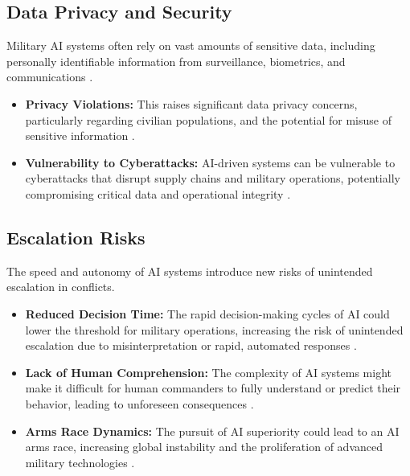 \subsection{Data Privacy and Security}
Military AI systems often rely on vast amounts of sensitive data, including personally identifiable information from surveillance, biometrics, and communications \cite{IE_DataPrivacy}.
\begin{itemize}
    \item \textbf{Privacy Violations:} This raises significant data privacy concerns, particularly regarding civilian populations, and the potential for misuse of sensitive information \cite{ISIJ_DataPrivacy}.
    \item \textbf{Vulnerability to Cyberattacks:} AI-driven systems can be vulnerable to cyberattacks that disrupt supply chains and military operations, potentially compromising critical data and operational integrity \cite{Scielo_DataSecurity}.
\end{itemize}

\subsection{Escalation Risks}
The speed and autonomy of AI systems introduce new risks of unintended escalation in conflicts.
\begin{itemize}
    \item \textbf{Reduced Decision Time:} The rapid decision-making cycles of AI could lower the threshold for military operations, increasing the risk of unintended escalation due to misinterpretation or rapid, automated responses \cite{ICANW_Escalation}.
    \item \textbf{Lack of Human Comprehension:} The complexity of AI systems might make it difficult for human commanders to fully understand or predict their behavior, leading to unforeseen consequences \cite{QA_Escalation}.
\item \textbf{Arms Race Dynamics:} The pursuit of AI superiority could lead to an AI arms race, increasing global instability and the proliferation of advanced military technologies \cite{TechNewsDay_Escalation}.
\end{itemize}

